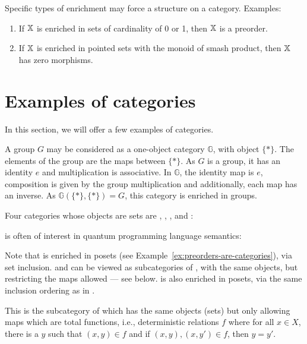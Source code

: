 Specific types of enrichment may force a structure on a category. Examples:
\begin{enumerate}
 \item If $\mathbb{X}$ is enriched in sets of cardinality of 0 or 1, then $\mathbb{X}$ is a preorder.
 \item If $\mathbb{X}$ is enriched in pointed sets with the monoid of smash product, then $\mathbb{X}$ has zero morphisms.
\end{enumerate}


\section{Examples of categories} %
\label{sub:examples_of_categories}
In this section, we will offer a few examples of categories.

\begin{example}
  A group $G$ may be considered as a one-object category $\mathbb{G}$, with object $\{*\}$. The elements of the
  group are the maps between $\{*\}$. As $G$ is a group, it has an identity $e$ and multiplication is
  associative. In $\mathbb{G}$, the identity map is $e$, composition is given
  by the group multiplication and additionally, each map has an inverse. As $\mathbb{G}(\{*\},\{*\})
  = G$, this category is enriched in groups.
\end{example}

Four categories whose objects are sets are \rel, \sets, \Par, and \pinj:

\begin{example}[\rel]\label{ex:category_rel}
\rel is often of interest in quantum programming language semantics:
\end{example}


Note that \rel is enriched in posets (see Example~\ref{ex:preorders-are-categories}), via set
inclusion. \sets and \Par can be viewed as subcategories of \rel, with the same objects, but
restricting the maps allowed --- see below. \Par is also enriched in posets, via the same inclusion
ordering as in \rel.

\begin{example}[\sets]\label{ex:category_sets}
This is the subcategory of \rel which has the same  objects (sets) but only allowing maps which are
total functions, i.e., deterministic relations $f$ where for all $x\in X$, there is a $y$ such
that $(x,y)\in f$ and if $(x,y), (x,y') \in f$, then $y = y'$.
\end{example}

